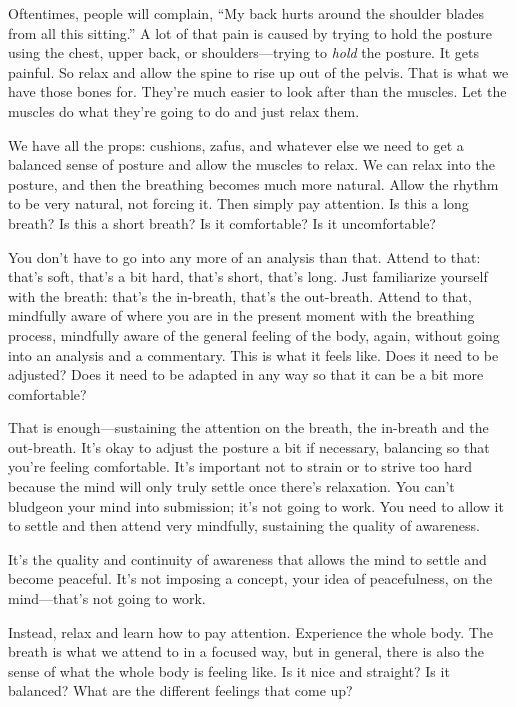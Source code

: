 Oftentimes, people will complain, “My back hurts around the shoulder
blades from all this sitting.” A lot of that pain is caused by trying to
hold the posture using the chest, upper back, or shoulders—trying to
\emph{hold} the posture. It gets painful. So relax and allow the spine
to rise up out of the pelvis. That is what we have those bones for.
They’re much easier to look after than the muscles. Let the muscles do
what they’re going to do and just relax them.

We have all the props: cushions, zafus, and whatever else we need to get
a balanced sense of posture and allow the muscles to relax. We can relax
into the posture, and then the breathing becomes much more natural.
Allow the rhythm to be very natural, not forcing it. Then simply pay
attention. Is this a long breath? Is this a short breath? Is it
comfortable? Is it uncomfortable?

You don’t have to go into any more of an analysis than that. Attend to
that: that’s soft, that’s a bit hard, that’s short, that’s long. Just
familiarize yourself with the breath: that’s the in-breath, that’s the
out-breath. Attend to that, mindfully aware of where you are in the
present moment with the breathing process, mindfully aware of the
general feeling of the body, again, without going into an analysis and a
commentary. This is what it feels like. Does it need to be adjusted?
Does it need to be adapted in any way so that it can be a bit more
comfortable?

That is enough—sustaining the attention on the breath, the in-breath and
the out-breath. It’s okay to adjust the posture a bit if necessary,
balancing so that you’re feeling comfortable. It’s important not to
strain or to strive too hard because the mind will only truly settle
once there’s relaxation. You can’t bludgeon your mind into submission;
it’s not going to work. You need to allow it to settle and then attend
very mindfully, sustaining the quality of awareness.

It’s the quality and continuity of awareness that allows the mind to
settle and become peaceful. It’s not imposing a concept, your idea of
peacefulness, on the mind—that’s not going to work.

Instead, relax and learn how to pay attention. Experience the whole
body. The breath is what we attend to in a focused way, but in general,
there is also the sense of what the whole body is feeling like. Is it
nice and straight? Is it balanced? What are the different feelings that
come up?

